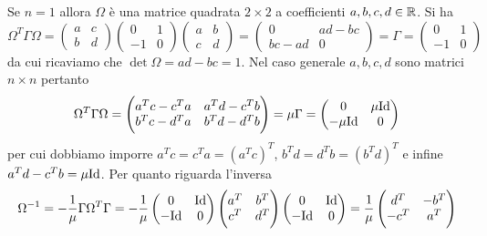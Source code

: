 \begin{solution}
    Se $ n = 1 $ allora $ \Omega $ è una matrice quadrata $ 2 \times 2 $ a coefficienti $ a, b, c, d \in \mathbb{R} $. Si ha
    \[
        \Omega^T \Gamma \Omega = 
        \begin{pmatrix}
        a & c \\
        b & d
        \end{pmatrix}
        \begin{pmatrix}
        0 & 1 \\
        -1 & 0
        \end{pmatrix}
        \begin{pmatrix}
        a & b \\
        c & d
        \end{pmatrix}
        =
        \begin{pmatrix}
        0 & ad - bc \\
        bc - ad & 0
        \end{pmatrix}
        =
        \Gamma =
        \begin{pmatrix}
        0 & 1 \\
        -1 & 0
        \end{pmatrix}
    \]
    da cui ricaviamo che $ \det{\Omega} = ad - bc = 1 $. Nel caso generale $ a, b, c, d $ sono matrici $ n \times n $ pertanto
    \[
    \Omega^T \Gamma \Omega =
    \begin{pmatrix}
    a^T c - c^T a & a^T d - c^T b \\
    b^T c - d^T a & b^T d - d^T b
    \end{pmatrix}
    =
    \mu \Gamma
    =
    \begin{pmatrix}
    0        & \mu \mathrm{Id} \\
    -\mu \mathrm{Id} & 0
    \end{pmatrix}
    \]
    per cui dobbiamo imporre $ a^T c = c^T a = (a^T c)^T $, $ b^T d = d^T b = (b^T d)^T $ e infine $ a^T d - c^T b = \mu \mathrm{Id} $. Per quanto riguarda l'inversa
    \[
        \Omega^{-1} = - \frac{1}{\mu} \Gamma \Omega^T \Gamma =
        - \frac{1}{\mu}
        \begin{pmatrix}
        0    & \mathrm{Id} \\
        -\mathrm{Id} & 0
        \end{pmatrix}
        \begin{pmatrix}
        a^T & b^T \\
        c^T & d^T
        \end{pmatrix}
        \begin{pmatrix}
        0    & \mathrm{Id} \\
        -\mathrm{Id} & 0
        \end{pmatrix}
        =
        \dfrac{1}{\mu}
        \begin{pmatrix}
        d^T  & -b^T \\
        -c^T & a^T
        \end{pmatrix}
    \]
\end{solution}

